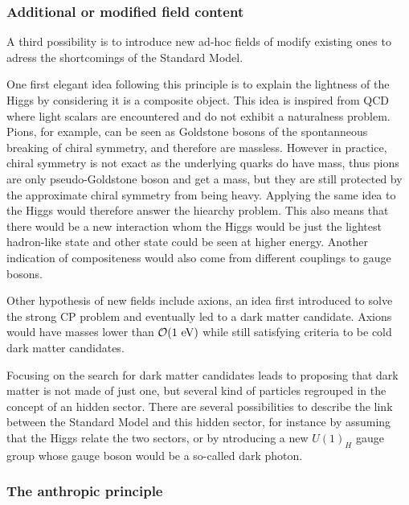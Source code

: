             \subsubsection{Additional or modified field content}

        A third possibility is to introduce new ad-hoc fields of modify existing ones
        to adress the shortcomings of the Standard Model.

        One first elegant idea following this principle is to explain the lightness of the
        Higgs by considering it is a composite object. This idea is inspired from QCD where
        light scalars are encountered and do not exhibit a naturalness problem. Pions,
        for example, can be seen as Goldstone bosons of the spontanneous breaking of chiral
        symmetry, and therefore are massless. However in practice, chiral symmetry is not exact as
        the underlying quarks do have mass, thus pions are only pseudo-Goldstone boson and get a mass,
        but they are still protected by the approximate chiral symmetry from being heavy.
        Applying the same idea to the Higgs would therefore answer the hiearchy problem.
        This also means that there would be a new interaction whom the Higgs would
        be just the lightest hadron-like state and other state could be seen at higher
        energy. Another indication of compositeness would also come from different couplings
        to gauge bosons.

        Other hypothesis of new fields include axions, an idea first introduced to solve
        the strong CP problem and eventually led to a dark matter candidate. Axions would
        have masses lower than $\mathcal{O}(1~\text{eV})$ while still satisfying criteria to
        be cold dark matter candidates.

        Focusing on the search for dark matter candidates leads to proposing that dark matter
        is not made of just one, but several kind of particles regrouped in the concept
        of an hidden sector. There are several possibilities to describe the link between
        the Standard Model and this hidden sector, for instance by assuming that the Higgs
        relate the two sectors, or by ntroducing a new
        $U(1)_H$ gauge group whose gauge boson would be a so-called dark photon.

            \subsubsection{The anthropic principle}

